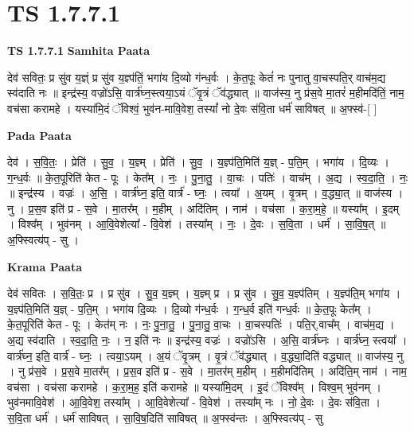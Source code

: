 \documentclass[17pt]{extarticle}
\begin{document}
\section{ TS 1.7.7.1 }

\textbf{TS 1.7.7.1 } \newline
\textbf{Samhita Paata} \newline

देव॑ सवितः॒ प्र सु॑व य॒ज्ञ्ं प्र सु॑व य॒ज्ञ्प॑तिं॒ भगा॑य दि॒व्यो ग॑न्ध॒र्वः । के॒त॒पूः केतं॑ नः पुनातु वा॒चस्पति॒र् वाच॑म॒द्य स्व॑दाति नः ॥ इन्द्र॑स्य॒ वज्रो॑ऽसि॒ वार्त्र॑घ्न॒स्त्वया॒ऽयं ॅवृ॒त्रं ॅव॑द्ध्यात् ॥ वाज॑स्य॒ नु प्र॑स॒वे मा॒तरं॑ म॒हीमदि॑तिं॒ नाम॒ वच॑सा करामहे । यस्या॑मि॒दं ॅविश्वं॒ भुव॑न-मावि॒वेश॒ तस्यां᳚ नो दे॒वः स॑वि॒ता धर्म॑ साविषत् ॥ अ॒फ्स्व॑-[ ] \newline

\textbf{Pada Paata} \newline

देव॑ । स॒वि॒तः॒ । प्रेति॑ । सु॒व॒ । य॒ज्ञ्म् । प्रेति॑ । सु॒व॒ । य॒ज्ञ्प॑ति॒मिति॑ य॒ज्ञ् - प॒ति॒म् । भगा॑य । दि॒व्यः । ग॒न्ध॒र्वः ॥ के॒त॒पूरिति॑ केत - पूः । केत᳚म् । नः॒ । पु॒ना॒तु॒ । वा॒चः । पतिः॑ । वाच᳚म् । अ॒द्य । स्व॒दा॒ति॒ । नः॒ ॥ इन्द्र॑स्य । वज्रः॑ । अ॒सि॒ । वार्त्र॑घ्न॒ इति॒ वार्त्र॑ - घ्नः॒ । त्वया᳚ । अ॒यम् । वृ॒त्रम् । व॒द्ध्या॒त् ॥ वाज॑स्य । नु । प्र॒स॒व इति॑ प्र - स॒वे । मा॒तर᳚म् । म॒हीम् । अदि॑तिम् । नाम॑ । वच॑सा । क॒रा॒म॒हे॒ ॥ यस्या᳚म् । इ॒दम् । विश्व᳚म् । भुव॑नम् । आ॒वि॒वेशेत्या᳚ - वि॒वेश॑ । तस्या᳚म् । नः॒ । दे॒वः । स॒वि॒ता । धर्म॑ । सा॒वि॒ष॒त् ॥ अ॒फ्स्वित्य॑प् - सु ।  \newline


\textbf{Krama Paata} \newline

देव॑ सवितः । स॒वि॒तः॒ प्र । प्र सु॑व । सु॒व॒ य॒ज्ञ्म् । य॒ज्ञ्म् प्र । प्र सु॑व । सु॒व॒ य॒ज्ञ्प॑तिम् । य॒ज्ञ्प॑ति॒म् भगा॑य । य॒ज्ञ्प॑ति॒मिति॑ य॒ज्ञ् - प॒ति॒म् । भगा॑य दि॒व्यः । दि॒व्यो ग॑न्ध॒र्वः । ग॒न्ध॒र्व इति॑ गन्ध॒र्वः ॥ के॒त॒पूः केत᳚म् । के॒त॒पूरिति॑ केत - पूः । केत॑म् नः । नः॒ पु॒ना॒तु॒ । पु॒ना॒तु॒ वा॒चः । वा॒चस्पतिः॑ । पति॒र्,वाच᳚म् । वाच॑म॒द्य । अ॒द्य स्व॑दाति । स्व॒दा॒ति॒ नः॒ । न॒ इति॑ नः ॥ इन्द्र॑स्य॒ वज्रः॑ । वज्रो॑ऽसि । अ॒सि॒ वार्त्र॑घ्नः । वार्त्र॑घ्न॒ स्त्वया᳚ । वार्त्र॑घ्न॒ इति॒ वार्त्र॑ - घ्नः॒ । त्वया॒ऽयम् । अ॒यं ॅवृ॒त्रम् । वृ॒त्रं ॅव॑द्ध्यात् । व॒द्ध्या॒दिति॑ वद्ध्यात् ॥ वाज॑स्य॒ नु । नु प्र॑स॒वे । प्र॒स॒वे मा॒तर᳚म् । प्र॒स॒व इति॑ प्र - स॒वे । मा॒तर॑म् म॒हीम् । म॒हीमदि॑तिम् । अदि॑ति॒म् नाम॑ । नाम॒ वच॑सा । वच॑सा करामहे । क॒रा॒म॒ह॒ इति॑ करामहे ॥ यस्या॑मि॒दम् । इ॒दं ॅविश्व᳚म् । विश्व॒म् भुव॑नम् । भुव॑नमावि॒वेश॑ । आ॒वि॒वेश॒ तस्या᳚म् । आ॒वि॒वेशेत्या᳚ - वि॒वेश॑ । तस्या᳚म् नः । नो॒ दे॒वः । दे॒वः स॑वि॒ता । स॒वि॒ता धर्म॑ । धर्म॑ साविषत् । सा॒वि॒ष॒दिति॑ साविषत् ॥ अ॒फ्स्व॑न्तः । अ॒फ्स्वित्य॑प् - सु \newline
\end{document}
